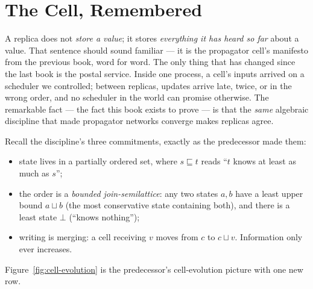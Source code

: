 \documentclass[12pt, a4paper, openright]{book}
\theoremstyle{thmstyle}
\theoremstyle{defstyle}
\begin{document}
\section{The Cell, Remembered}

A replica does not \emph{store a value}; it stores \emph{everything it
has heard so far} about a value. That sentence should sound familiar ---
it is the propagator cell's manifesto from the previous book, word for
word. The only thing that has changed since the last book is the postal
service. Inside one process, a cell's inputs arrived on a scheduler we
controlled; between replicas, updates arrive late, twice, or in the
wrong order, and no scheduler in the world can promise otherwise. The
remarkable fact --- the fact this book exists to prove --- is that the
\emph{same} algebraic discipline that made propagator networks converge
makes replicas agree.

Recall the discipline's three commitments, exactly as the predecessor
made them:

\begin{itemize}
  \item state lives in a partially ordered set, where $s \sqsubseteq t$
    reads ``$t$ knows at least as much as $s$'';
  \item the order is a \emph{bounded join-semilattice}: any two states
    $a, b$ have a least upper bound $a \sqcup b$ (the most conservative
    state containing both), and there is a least state $\bot$ (``knows
    nothing'');
  \item writing is merging: a cell receiving $v$ moves from $c$ to
    $c \sqcup v$. Information only ever increases.
\end{itemize}

Figure~\ref{fig:cell-evolution} is the predecessor's cell-evolution
picture with one new row.
\end{document}
